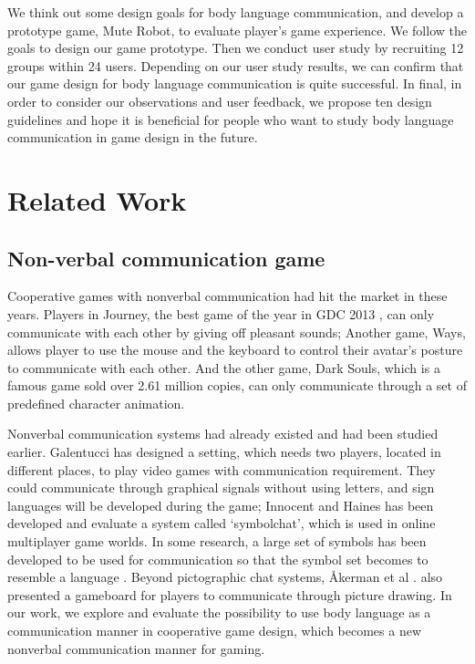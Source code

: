 \documentclass{sigchi}
\begin{document}
We think out some design goals for body language communication, and develop a prototype game, Mute Robot, to evaluate player's game experience. We follow the goals to design our game prototype. Then we conduct user study by recruiting 12 groups within 24 users. Depending on our user study results, we can confirm that our game design for body language communication is quite successful. In final, in order to consider our observations and user feedback, we propose ten design guidelines and hope it is beneficial for people who want to study body language communication in game design in the future. 


\section{Related Work}
\subsection{Non-verbal communication game}

Cooperative games with nonverbal communication had hit the market in these years. Players in Journey, the best game of the year in GDC 2013 \cite{I0}, can only communicate with each other by giving off pleasant sounds; Another game, Ways, allows player to use the mouse and the keyboard to control their avatar’s posture to communicate with each other. And the other game, Dark Souls, which is a famous game sold over 2.61 million copies, can only communicate through a set of predefined character animation.

Nonverbal communication systems had already existed and had been studied earlier. 
Galentucci \cite{I1} has designed a setting, which needs two players, located in different places, to play video games with communication requirement.
They could communicate through graphical signals without using letters, and sign languages will be developed during the game; 
Innocent and Haines \cite{I2} has been developed and evaluate a system called ‘symbolchat’, which is used in online multiplayer game worlds. In some research, a large set of symbols has been developed to be used for communication so that the symbol set becomes to resemble a language \cite{I3,I4}. Beyond pictographic chat systems, Åkerman et al \cite{I5}. also presented a gameboard for players to communicate through picture drawing. In our work, we explore and evaluate the possibility to use body language as a communication manner in cooperative game design, which becomes a new nonverbal communication manner for gaming.
\end{document}
